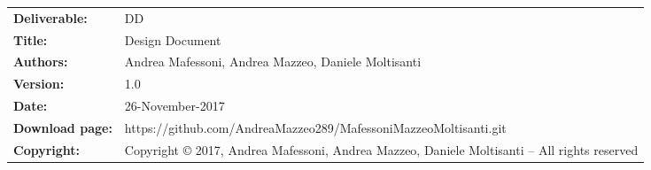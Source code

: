 	\begin{table}[h!]
		\begin{tabu} to \textwidth { X[0.3,r,p] X[0.7,l,p] }
			\hline
			
			\textbf{Deliverable:} & DD\\
			\textbf{Title:} & Design Document \\
			\textbf{Authors:} & Andrea Mafessoni, Andrea Mazzeo, Daniele Moltisanti \\
			\textbf{Version:} & 1.0 \\ 
			\textbf{Date:} & 26-November-2017 \\
			\textbf{Download page:} & https://github.com/AndreaMazzeo289/MafessoniMazzeoMoltisanti.git \\
			\textbf{Copyright:} & Copyright © 2017, Andrea Mafessoni, Andrea Mazzeo, Daniele Moltisanti – All rights reserved \\
			\hline
		\end{tabu}
	\end{table}
	
	
	
	
	\setcounter{page}{2}
	
	
	\newpage
	\tableofcontents
	\newpage
	\listoffigures
	
	\clearpage
	{}
	\label{sect:Introduction}
	
	
	\clearpage
	{}
	\label{sect:ArchitecturalDesign}
	
	
	\clearpage
	{}
	\label{sect:AlgorithmDesign}
	
	
